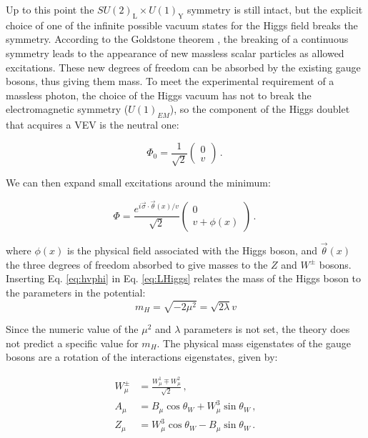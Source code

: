 Up to this point the $SU(2)_\mathrm{L} \times U(1)_\mathrm{Y}$ symmetry is still intact, but the explicit choice of one of the infinite possible vacuum states for the Higgs field breaks the symmetry. According to the Goldstone theorem \cite{Goldstone:1962es}, the breaking of a continuous symmetry leads to the appearance of new massless scalar particles as allowed excitations. These new degrees of freedom can be absorbed by the existing gauge bosons, thus giving them mass. To meet the experimental requirement of a massless photon, the choice of the Higgs vacuum has not to break the electromagnetic symmetry ($U(1)_{EM}$), so the component of the Higgs doublet that acquires a VEV is the neutral one:

\begin{equation}
	\Phi_0 = \frac{1}{\sqrt{2}} \left( \begin{array}{c} 0 \\ v  \end{array} \right) \, . \
\label{eq:hvphi}
\end{equation}

We can then expand small excitations around the minimum:

\begin{equation}
	\Phi = \frac{e^{i \vec{\sigma} \cdot \vec{\theta}(x)/v }}{\sqrt{2}} \left( \begin{array}{c} 0 \\ v + \phi(x) \end{array} \right) \, . \
\label{eq:hvphi}
\end{equation}

\noindent where $\phi(x)$ is the physical field associated with the Higgs boson, and $\vec{\theta}(x)$ the three degrees of freedom absorbed to give masses to the $Z$ and $W^\pm$ bosons. Inserting Eq. \ref{eq:hvphi} in Eq. \ref{eq:LHiggs} relates the mass of the Higgs boson to the parameters in the potential:
\begin{equation}
m_H = \sqrt{- 2 \mu^2} = \sqrt{2 \lambda} v
\label{eq:sm:Higgsmass}
\end{equation}

Since the numeric value of the $\mu^2$ and $\lambda$ parameters is not set, the theory does not predict a specific value for $m_H$. 
The physical mass eigenstates of the gauge bosons are a rotation of the interactions eigenstates, given by:

\begin{equation}
\begin{aligned}
W_\mu^\pm &= \frac{W_\mu^1 \mp W_\mu^2}{\sqrt{2}} \, , \\
A_\mu &= B_\mu \cos\theta_W + W^3_\mu \sin\theta_W \, ,  \\
Z_\mu &= W^3_\mu \cos\theta_W - B_\mu \sin\theta_W \, .
\end{aligned}
\label{eq:wein}
\end{equation}

